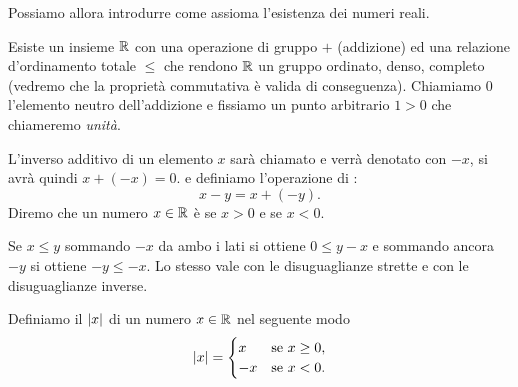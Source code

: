 Possiamo allora introdurre come assioma l'esistenza dei 
numeri reali.

\begin{axiom}
  Esiste un insieme $\mathbb R$ con una operazione di gruppo $+$ (addizione) 
  ed una relazione d'ordinamento 
  totale $\le$ che rendono $\mathbb R$ un gruppo ordinato, denso, completo 
  (vedremo che la proprietà commutativa è valida di conseguenza).
  Chiamiamo $0$ l'elemento neutro dell'addizione e fissiamo un punto arbitrario $1>0$ 
  che chiameremo \emph{unità}. 
\end{axiom}

L'inverso additivo di un elemento $x$ sarà chiamato 
 e verrà denotato con $-x$, si avrà quindi $x + (-x) = 0$.
e definiamo l'operazione di :
\[
    x- y = x + (-y).
\]
Diremo che un numero $x\in \mathbb R$ è  se $x>0$ 
e  se $x<0$.

Se $x\le y$ sommando $-x$ da ambo i lati si ottiene 
$0 \le y-x$ e sommando ancora $-y$ si ottiene 
$-y \le -x$. Lo stesso vale con le disuguaglianze strette
e con le disuguaglianze inverse.

\begin{definition}
  \mymark{***}
  Definiamo il  ${\left|x\right|}$ di un numero $x\in \mathbb R$ nel seguente modo
  \[
  {\left|x\right|} =
  \begin{cases}
    x & \text{se $x\ge 0$}, \\
    -x & \text{se $x<0 $}.
  \end{cases}
  \]
  \end{definition}
  

